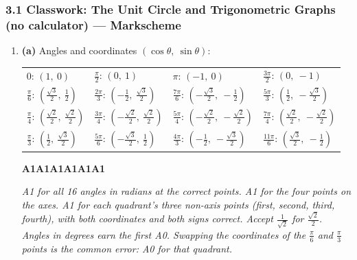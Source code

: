 \documentclass[12pt, twoside]{article}
\begin{document}
\subsubsection*{3.1 Classwork: The Unit Circle and Trigonometric Graphs (no calculator) --- Markscheme}

\begin{enumerate}[itemsep=0.3cm]

\item[1.] [Maximum mark: 14]

\textbf{(a)} Angles and coordinates $\left(\cos\theta,\ \sin\theta\right)$:

\begin{center}
\renewcommand{\arraystretch}{1.6}
\begin{tabular}{llll}
$0$: $(1,\ 0)$ &
$\frac{\pi}{2}$: $(0,\ 1)$ &
$\pi$: $(-1,\ 0)$ &
$\frac{3\pi}{2}$: $(0,\ -1)$ \\
$\frac{\pi}{6}$: $\left(\frac{\sqrt{3}}{2},\ \frac{1}{2}\right)$ &
$\frac{2\pi}{3}$: $\left(-\frac{1}{2},\ \frac{\sqrt{3}}{2}\right)$ &
$\frac{7\pi}{6}$: $\left(-\frac{\sqrt{3}}{2},\ -\frac{1}{2}\right)$ &
$\frac{5\pi}{3}$: $\left(\frac{1}{2},\ -\frac{\sqrt{3}}{2}\right)$ \\
$\frac{\pi}{4}$: $\left(\frac{\sqrt{2}}{2},\ \frac{\sqrt{2}}{2}\right)$ &
$\frac{3\pi}{4}$: $\left(-\frac{\sqrt{2}}{2},\ \frac{\sqrt{2}}{2}\right)$ &
$\frac{5\pi}{4}$: $\left(-\frac{\sqrt{2}}{2},\ -\frac{\sqrt{2}}{2}\right)$ &
$\frac{7\pi}{4}$: $\left(\frac{\sqrt{2}}{2},\ -\frac{\sqrt{2}}{2}\right)$ \\
$\frac{\pi}{3}$: $\left(\frac{1}{2},\ \frac{\sqrt{3}}{2}\right)$ &
$\frac{5\pi}{6}$: $\left(-\frac{\sqrt{3}}{2},\ \frac{1}{2}\right)$ &
$\frac{4\pi}{3}$: $\left(-\frac{1}{2},\ -\frac{\sqrt{3}}{2}\right)$ &
$\frac{11\pi}{6}$: $\left(\frac{\sqrt{3}}{2},\ -\frac{1}{2}\right)$ \\
\end{tabular}
\end{center}

\hfill \textbf{A1A1A1A1A1A1}

\emph{A1 for all 16 angles in radians at the correct points. A1 for the
four points on the axes. A1 for each quadrant's three non-axis points
(first, second, third, fourth), with both coordinates and both signs
correct. Accept $\frac{1}{\sqrt{2}}$ for $\frac{\sqrt{2}}{2}$. Angles in
degrees earn the first A0. Swapping the coordinates of the $\frac{\pi}{6}$
and $\frac{\pi}{3}$ points is the common error: A0 for that quadrant.}


\end{enumerate}
\end{document}
